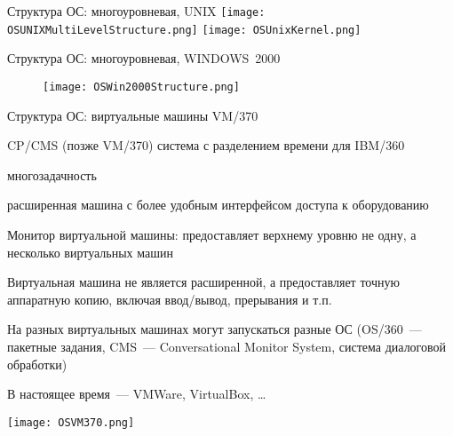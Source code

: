 \documentclass[aspectratio=169,14pt]{beamer}
\begin{document}
\begin{frame}{Структура ОС: многоуровневая, UNIX}
    \texttt{[image: OSUNIXMultiLevelStructure.png]}
    \texttt{[image: OSUnixKernel.png]}
\end{frame}

\begin{frame}{Структура ОС: многоуровневая, WINDOWS~2000}
    \begin{figure}[htp]
        \centering
        \texttt{[image: OSWin2000Structure.png]}
    \end{figure}
\end{frame}

\begin{frame}{Структура ОС: виртуальные машины VM/370}
    \begin{itemize}
        \begin{footnotesize}
        \item CP/CMS (позже VM/370) система с разделением времени для IBM/360
        \begin{itemize}
        \begin{footnotesize}
            \item многозадачность
            \item расширенная машина с более удобным интерфейсом
            доступа к оборудованию
        \end{footnotesize}
        \end{itemize}
        \item Монитор виртуальной машины: предоставляет верхнему уровню не
        одну, а несколько виртуальных машин
        \item Виртуальная машина не является расширенной, а предоставляет
        точную аппаратную копию, включая ввод/вывод, прерывания и т.п.
        \item На разных виртуальных машинах могут запускаться разные ОС
        (OS/360~--- пакетные задания, CMS~--- Conversational Monitor
        System, система диалоговой обработки)
        \item В настоящее время~--- VMWare, VirtualBox, \ldots
        \end{footnotesize}
    \end{itemize}
    \texttt{[image: OSVM370.png]}
\end{frame}
\end{document}
